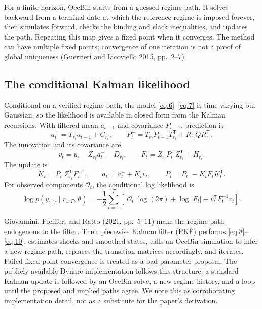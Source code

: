 \documentclass[11pt]{article}
\begin{document}
For a finite horizon, OccBin starts from a guessed regime path. It solves
backward from a terminal date at which the reference regime is imposed
forever, then simulates forward, checks the binding and slack inequalities,
and updates the path. Repeating this map gives a fixed point when it
converges. The method can have multiple fixed points; convergence of one
iteration is not a proof of global uniqueness (Guerrieri and Iacoviello 2015,
pp.~2--7).

\subsection{The conditional Kalman likelihood}\label{sec:linear-kalman}

Conditional on a verified regime path, the model \eqref{eq:6}--\eqref{eq:7}
is time-varying but Gaussian, so the likelihood is available in closed form
from the Kalman recursions. With filtered mean \(a_{t-1}\) and covariance
\(P_{t-1}\), prediction is
\begin{equation}\label{eq:8}
 a_t^- =T_{r_t}a_{t-1}+C_{r_t},
\qquad
 P_t^- =T_{r_t}P_{t-1}T_{r_t}^{\mathsf T}+R_{r_t}QR_{r_t}^{\mathsf T}.
\end{equation}
The innovation and its covariance are
\begin{equation}\label{eq:9}
 v_t=y_t-Z_{r_t}a_t^- -D_{r_t},
 \qquad
 F_t=Z_{r_t}P_t^-Z_{r_t}^{\mathsf T}+H_{r_t}.
\end{equation}
The update is
\begin{equation}\label{eq:10}
 K_t=P_t^-Z_{r_t}^{\mathsf T}F_t^{-1},\qquad
 a_t=a_t^-+K_tv_t,\qquad
 P_t=P_t^- -K_tF_tK_t^{\mathsf T}.
\end{equation}
For observed components \(\mathcal O_t\), the conditional log likelihood is
\begin{equation}\label{eq:11}
 \log p(y_{1:T}\mid r_{1:T},\vartheta)
 =-\frac12\sum_{t=1}^T
 \left[|\mathcal O_t|\log(2\pi)+\log|F_t|+v_t^{\mathsf T}F_t^{-1}v_t\right].
\end{equation}

Giovannini, Pfeiffer, and Ratto (2021, pp.~5--11) make the regime path
endogenous to the filter. Their piecewise Kalman filter (PKF) performs
\eqref{eq:8}--\eqref{eq:10}, estimates shocks and smoothed states, calls an
OccBin simulation to infer a new regime path, replaces the transition
matrices accordingly, and iterates. Failed fixed-point convergence is treated
as a bad parameter proposal. The publicly available Dynare implementation
follows this structure: a standard Kalman update is followed by an OccBin
solve, a new regime history, and a loop until the proposed and implied paths
agree. We note this as corroborating implementation detail, not as a
substitute for the paper's derivation.
\end{document}
